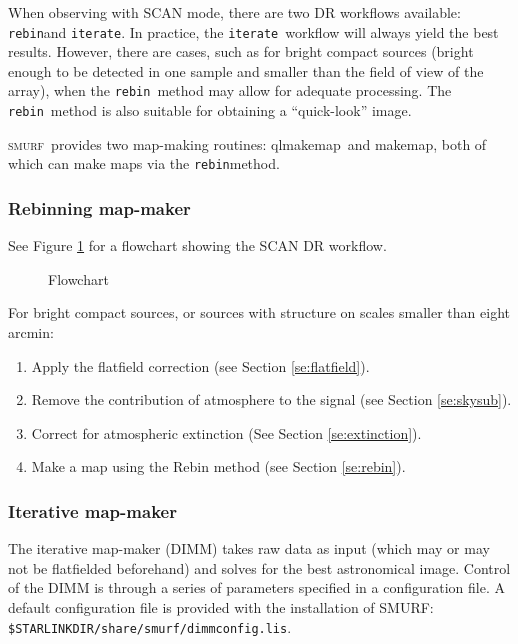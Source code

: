 \documentclass[twoside,11pt]{article}
\newcommand{\xref}[3]{#1}
\newcommand{\xlabel}[1]{}
\renewcommand{\_}{\texttt{\symbol{95}}}
\newcommand{\SMURF}{\textsc{smurf}}
\newcommand{\task}[1]{\textsf{#1}}
\newcommand{\qlmakemap}{\xref{\task{qlmakemap}}{sun258}{QLMAKEMAP}}
\newcommand{\makemap}{\xref{\task{makemap}}{sun258}{MAKEMAP}}
\newcommand{\rebin}{\texttt{rebin}}
\newcommand{\iterate}{\texttt{iterate}}
\begin{document}
When observing with SCAN mode, there are two DR workflows available:
\rebin and \iterate. In practice, the \iterate\ workflow will always
yield the best results. However, there are cases, such as for bright
compact sources (bright enough to be detected in one sample and
smaller than the field of view of the array), when the \rebin\ method
may allow for adequate processing. The \rebin\ method is also suitable
for obtaining a ``quick-look'' image.

\SMURF\ provides two map-making routines: \qlmakemap\ and \makemap,
both of which can make maps via the \rebin method.

\subsubsection{\xlabel{rebin}Rebinning map-maker\label{se:rebin}}

See Figure \ref{flow} for a flowchart showing the SCAN DR workflow.

\begin{figure}
\caption{Flowchart\label{flow}}
\end{figure}

For bright compact sources, or sources with structure on scales
smaller than eight arcmin:
\begin{enumerate}
\item Apply the flatfield correction (see Section \ref{se:flatfield}).
\item Remove the contribution of atmosphere to the signal (see Section \ref{se:skysub}).
\item Correct for atmospheric extinction (See Section \ref{se:extinction}).
\item Make a map using the Rebin method (see Section \ref{se:rebin}).
\end{enumerate}

\subsubsection{\xlabel{iterate}Iterative map-maker\label{se:iterate}}

The iterative map-maker (DIMM) takes raw data as input (which may or
may not be flatfielded beforehand) and solves for the best
astronomical image. Control of the DIMM is through a series of
parameters specified in a configuration file. A default configuration
file is provided with the installation of SMURF:
\texttt{\$STARLINK\_DIR/share/smurf/dimmconfig.lis}.
\end{document}
